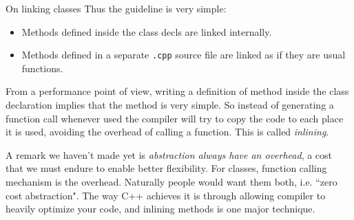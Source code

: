 \begin{frame}{On linking classes}
Thus the guideline is very simple:
\begin{itemize}
\item Methods defined inside the class decls are linked internally.
\item Methods defined in a separate \texttt{.cpp} source file are linked as if they are usual functions.
\end{itemize}
From a performance point of view, writing a definition of method inside the class declaration implies that the method is very simple. So instead of generating a function call whenever used the compiler will try to copy the code to each place it is used, avoiding the overhead of calling a function. This is called \textit{inlining}. 

\vspace{0.05in}
A remark we haven't made yet is \textit{abstraction always have an overhead}, a cost that we must endure to enable better flexibility. For classes, function calling mechanism is the overhead. Naturally people would want them both, i.e. ``zero cost abstraction". The way C++ achieves it is through allowing compiler to heavily optimize your code, and inlining methods is one major technique.
\end{frame}